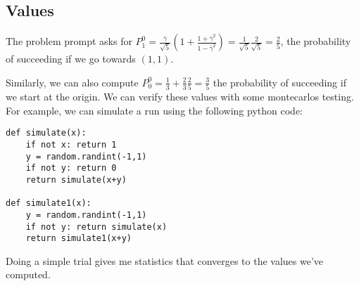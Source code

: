 \subsection*{Values}

The problem prompt asks for $P^0_1 = \frac{\bar\gamma}{\sqrt{5}}\left(1 + \frac{1+\bar\gamma^2}{1 - \bar\gamma^2}\right) = \frac{1}{\sqrt{5}}\frac{2}{\sqrt{5}} = \boxed{\frac{2}{5}}$, the probability of succeeding if we go towards $(1,1)$.

Similarly, we can also compute $P_0^0 = \frac13 + \frac23 \frac25 = \boxed{\frac35}$ the probability of succeeding if we start at the origin. We can verify these values with some montecarlos testing. For example, we can simulate a run using the following python code:

\begin{verbatim}
def simulate(x):
    if not x: return 1
    y = random.randint(-1,1)
    if not y: return 0
    return simulate(x+y)

def simulate1(x):
    y = random.randint(-1,1)
    if not y: return simulate(x)
    return simulate1(x+y)
\end{verbatim}

Doing a simple trial gives me statistics that converges to the values we've computed.